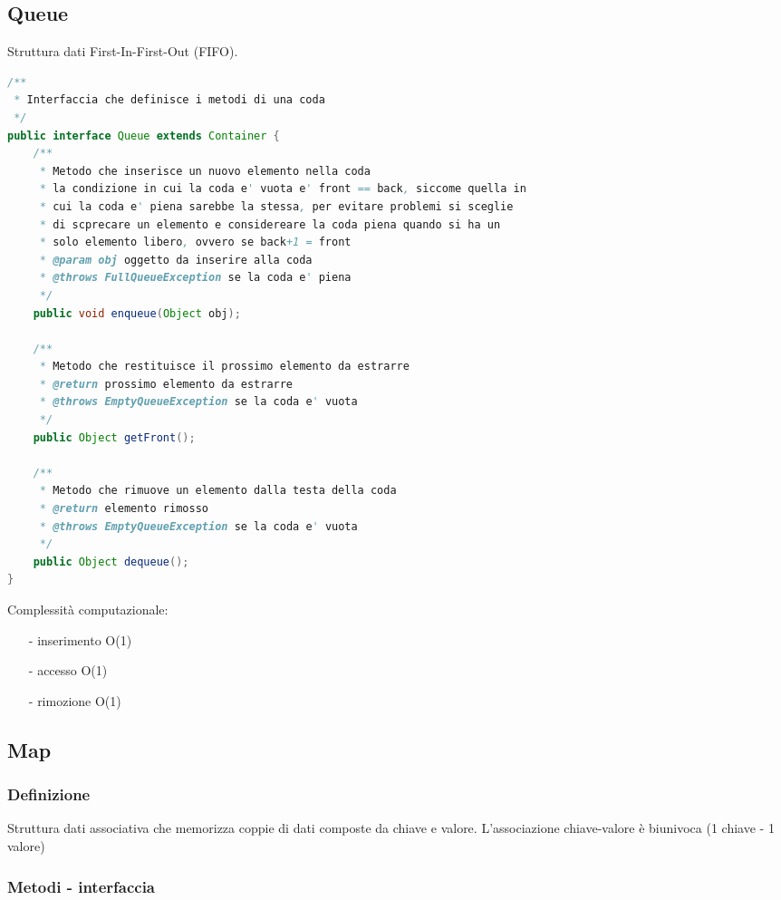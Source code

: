 \documentclass{article}
\begin{document}
\subsection{Queue}
Struttura dati First-In-First-Out (FIFO).
\begin{lstlisting}[language=Java]
/**
 * Interfaccia che definisce i metodi di una coda
 */
public interface Queue extends Container {
	/**
	 * Metodo che inserisce un nuovo elemento nella coda
	 * la condizione in cui la coda e' vuota e' front == back, siccome quella in
	 * cui la coda e' piena sarebbe la stessa, per evitare problemi si sceglie
	 * di scprecare un elemento e considereare la coda piena quando si ha un
	 * solo elemento libero, ovvero se back+1 = front
	 * @param obj oggetto da inserire alla coda
	 * @throws FullQueueException se la coda e' piena
	 */
	public void enqueue(Object obj);

	/**
	 * Metodo che restituisce il prossimo elemento da estrarre
	 * @return prossimo elemento da estrarre
	 * @throws EmptyQueueException se la coda e' vuota
	 */
	public Object getFront();
	
	/**
	 * Metodo che rimuove un elemento dalla testa della coda
	 * @return elemento rimosso
	 * @throws EmptyQueueException se la coda e' vuota
	 */
	public Object dequeue();
}   
\end{lstlisting}

Complessità computazionale:
\begin{itemize} [topsep=3pt, itemsep=0pt]
	\item[-] inserimento O(1)
	\item[-] accesso O(1)
	\item[-] rimozione O(1)
\end{itemize}


\subsection{Map}
\subsubsection*{Definizione}
Struttura dati associativa che memorizza coppie di dati composte da chiave e valore.
L'associazione chiave-valore è biunivoca (1 chiave - 1 valore)

\subsubsection*{Metodi - interfaccia}
\end{document}
